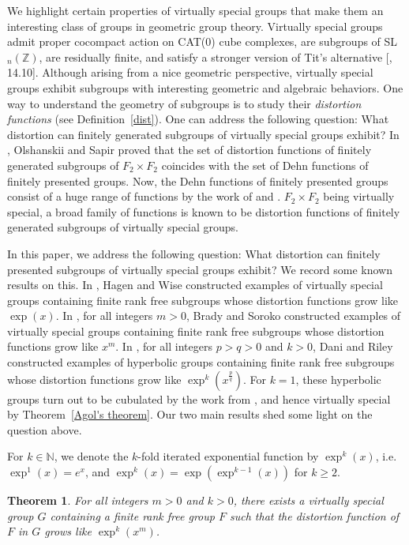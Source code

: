 \documentclass[oneside,11pt,reqno]{amsart}
\newtheorem{thm}{Theorem}[section]
\theoremstyle{definition}
\begin{document}
We highlight certain properties of virtually special groups that make them an interesting class of groups in geometric group theory. Virtually special groups admit proper cocompact action on CAT($0$) cube complexes, are subgroups of SL$_n(\mathbb{Z})$, are residually finite, and satisfy a stronger version of Tit's alternative [\cite{wiseann}, 14.10]. Although arising from a nice geometric perspective, virtually special groups exhibit subgroups with interesting geometric and algebraic behaviors. One way to understand the geometry of subgroups is to study their \emph{distortion functions} (see Definition~\ref{dist}). One can address the following question: What distortion can finitely generated subgroups of virtually special groups exhibit? In \cite{osapir}, Olshanskii and Sapir proved that the set of distortion functions of finitely generated subgroups of $F_2 \times F_2$ coincides with the set of Dehn functions of finitely presented groups. Now, the Dehn functions of finitely presented groups consist of a huge range of functions by the work of \cite{SBR} and \cite{sapir}. $F_2 \times F_2$ being virtually special, a broad family of functions is known to be distortion functions of finitely generated subgroups of virtually special groups. 

 In this paper, we address the following question: What distortion can finitely presented subgroups of virtually special groups exhibit? We record some known results on this. In \cite{HW}, Hagen and Wise constructed examples of virtually special groups containing finite rank free subgroups whose distortion functions grow like $\exp(x)$. In \cite{BS}, for all integers $m >0$, Brady and Soroko constructed examples of virtually special groups containing finite rank free subgroups whose distortion functions grow like $x^m$. In \cite{DARI}, for all integers $p > q >0$ and $k > 0$, Dani and Riley constructed examples of hyperbolic groups containing finite rank free subgroups whose distortion functions grow like $\exp^k(x^{\frac{p}{q}})$. For $k=1$, these hyperbolic groups turn out to be cubulated by the work from \cite{MR2053602}, and hence virtually special by Theorem~\ref{Agol's theorem}.
Our two main results shed some light on the question above.

For $k \in \mathbb{N}$, we denote the $k$-fold iterated exponential function by $\exp^k(x)$, i.e. $\exp^1(x)=e^x$, and $\exp^k(x)=\exp(\exp^{k-1}(x))$ for $k \geq 2$. 




\begin{thm}\label{thm1}
For all integers $m > 0$ and $k > 0$, there exists a virtually special group $G$ containing a finite rank free group $F$ such that the distortion function of $F$ in $G$ grows like $\exp^k(x^m)$.
\end{thm}
 
\end{document}
